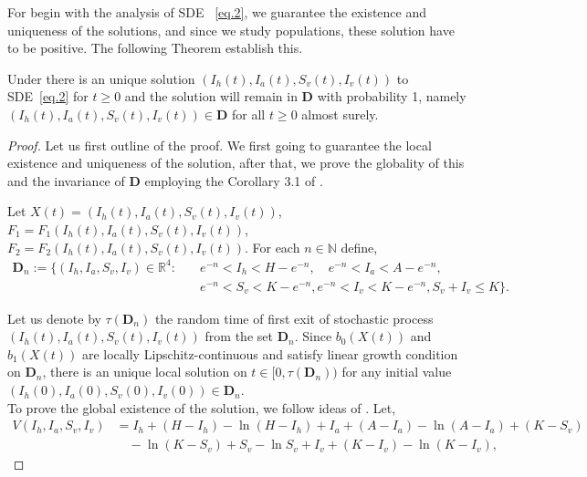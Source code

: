 	For begin with the analysis of SDE ~\eqref{eq.2}, we guarantee the existence 
	and uniqueness of the solutions, and since we study populations, these 
	solution have to be positive. The following Theorem establish this.
\begin{theorem}\label{thm:regularity}
		Under  there is an unique solution 
		$\left( I_{h}(t),I_{a}(t),S_{v}(t),I_{v}(t) \right)$ to SDE~\eqref{eq.2} 
		for $t\geq 0$ and the 
	solution will remain in $\mathbf{D}$ with probability 1, namely $\left( 
	I_{h}(t),I_{a}(t),S_{v}(t),I_{v}(t) \right)\in \mathbf{D}$ for all $t\geq 0$ almost surely.
\end{theorem}
\begin{proof}
	Let us first outline of the proof. We first going to guarantee the local 
existence and uniqueness of the solution, after that, we prove the globality 
of this and the invariance of $\mathbf{D}$ employing  the Corollary 3.1 of 
\citet[p.~76]{Khasminskii2012}.

	Let 
	$
		X(t)=( I_{h}(t),I_{a}(t),S_{v}(t),I_{v}(t) )
	$,
$
	F_{1} = F_{1}\left(I_{h}(t),I_{a}(t),S_{v}(t),I_{v}(t)\right)
$,
$
	F_{2} = F_{2}\left(I_{h}(t),I_{a}(t),S_{v}(t),I_{v}(t)\right)
$.
For each $n\in \mathbb{N}$ define,
\begin{align*}
	\mathbf{D}_{n}
		:= 
		\{ 
			\left( 
				I_{h},I_{a},S_{v},I_{v} 
			\right)\in \mathbb{R}^{4}:
			\quad
			& 
			e^{-n} < I_{h} < H-e^{-n},
			\quad
			e^{-n} < I_{a} < A-e^{-n}, \\
			&
			e^{-n} < S_{v} < K-e^{-n},
			e^{-n} < I_{v} < K-e^{-n},
			S_{v}+I_{v} \leq K 
		 \}.
\end{align*}

Let us denote by $\tau(\mathbf{D}_{n})$  the random time of first 
exit of stochastic process $\left( I_{h}(t),I_{a}(t),S_{v}(t),I_{v}(t) \right)$ from the 
set $\mathbf{D}_{n}$. 
Since $b_{0}(X(t))$ and $b_{1}(X(t))$ are locally Lipschitz-continuous and satisfy 
linear growth condition on $\mathbf{D}_{n}$, there is an unique local solution on 
$t\in [0,\tau(\mathbf{D}_{n}))$ for any initial value 
$\left( I_{h}(0),I_{a}(0),S_{v}(0),I_{v}(0) \right)\in \mathbf{D}_{n}$.\\

	To prove the global existence of the solution, we follow ideas of 
\cite{Schurz2015}. 
Let,
\begin{align*}
	V\left( I_{h},I_{a},S_{v},I_{v} \right) 
		&= I_{h} 
		+ (H-I_{h}) 
		- \ln(H-I_{h}) 
		+ I_{a} + (A-I_{a}) -
		\ln(A-I_{a}) + (K-S_{v})\\
		&\quad -\ln (K-S_{v}) 
		+ S_{v} 
		- \ln S_{v} 
		+ I_{v} 
		+ (K-I_{v}) 
		- \ln(K-I_{v}),
\end{align*}


\end{proof}

